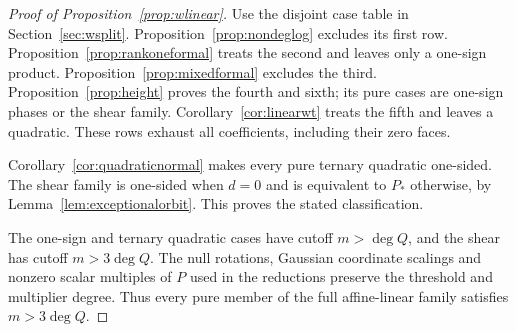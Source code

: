 \begin{proof}[Proof of Proposition~\ref{prop:wlinear}]
Use the disjoint case table in Section~\ref{sec:wsplit}.
Proposition~\ref{prop:nondeglog} excludes its first row.
Proposition~\ref{prop:rankoneformal} treats the second and leaves
only a one-sign product. Proposition~\ref{prop:mixedformal} excludes
the third. Proposition~\ref{prop:height} proves the fourth and sixth;
its pure cases are one-sign phases or the shear family.
Corollary~\ref{cor:linearwt} treats the fifth and leaves a quadratic.
These rows exhaust all coefficients, including their zero faces.

Corollary~\ref{cor:quadraticnormal} makes every pure ternary quadratic
one-sided. The shear family is one-sided when $d=0$ and is equivalent
to $P_*$ otherwise, by Lemma~\ref{lem:exceptionalorbit}. This proves
the stated classification.

The one-sign and ternary quadratic cases have cutoff $m>\deg Q$,
and the shear has cutoff $m>3\deg Q$. The null rotations,
Gaussian coordinate scalings and nonzero scalar multiples of $P$
used in the reductions preserve the threshold and multiplier degree.
Thus every pure member of the full affine-linear family satisfies
$m>3\deg Q$.
\end{proof}


